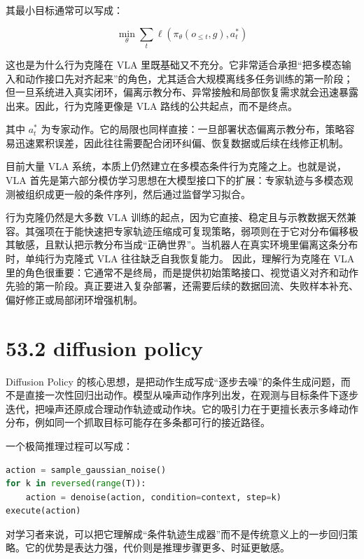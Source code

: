 其最小目标通常可以写成：

\begingroup
\footnotesize
\begin{equation*}
\min_\theta \sum_t \ell(\pi_\theta(o_{\le t}, g), a_t^\ast)
\end{equation*}
\endgroup

这也是为什么行为克隆在 VLA 里既基础又不充分。它非常适合承担“把多模态输入和动作接口先对齐起来”的角色，尤其适合大规模离线多任务训练的第一阶段；但一旦系统进入真实闭环，偏离示教分布、异常接触和局部恢复需求就会迅速暴露出来。因此，行为克隆更像是 VLA 路线的公共起点，而不是终点。

其中 \(a_t^\ast\) 为专家动作。它的局限也同样直接：一旦部署状态偏离示教分布，策略容易迅速累积误差，因此往往需要配合闭环纠偏、恢复数据或后续在线修正机制。

目前大量 VLA 系统，本质上仍然建立在多模态条件行为克隆之上。也就是说，VLA 首先是第六部分模仿学习思想在大模型接口下的扩展：专家轨迹与多模态观测被组织成更一般的条件序列，然后通过监督学习拟合。

行为克隆仍然是大多数 VLA 训练的起点，因为它直接、稳定且与示教数据天然兼容。其强项在于能快速把专家轨迹压缩成可复现策略，弱项则在于它对分布偏移极其敏感，且默认把示教分布当成“正确世界”。当机器人在真实环境里偏离这条分布时，单纯行为克隆式 VLA 往往缺乏自我恢复能力。 因此，理解行为克隆在 VLA 里的角色很重要：它通常不是终局，而是提供初始策略接口、视觉语义对齐和动作先验的第一阶段。真正要进入复杂部署，还需要后续的数据回流、失败样本补充、偏好修正或局部闭环增强机制。

\section*{53.2 diffusion policy}


Diffusion Policy 的核心思想，是把动作生成写成“逐步去噪”的条件生成问题，而不是直接一次性回归出动作。模型从噪声动作序列出发，在观测与目标条件下逐步迭代，把噪声还原成合理动作轨迹或动作块。它的吸引力在于更擅长表示多峰动作分布，例如同一个抓取目标可能存在多条都可行的接近路径。

一个极简推理过程可以写成：

\begin{lstlisting}[language=python]
action = sample_gaussian_noise()
for k in reversed(range(T)):
    action = denoise(action, condition=context, step=k)
execute(action)
\end{lstlisting}

对学习者来说，可以把它理解成“条件轨迹生成器”而不是传统意义上的一步回归策略。它的优势是表达力强，代价则是推理步骤更多、时延更敏感。

